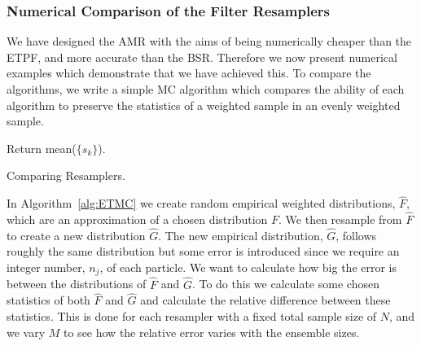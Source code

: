 \documentclass[final]{siamltex}
\begin{document}

\subsubsection{Numerical Comparison of the Filter Resamplers}

We have designed the AMR with the aims of being numerically cheaper than the ETPF, and more accurate
than the BSR. Therefore we now present numerical examples which demonstrate that we have achieved
this. To compare the algorithms, we write a simple MC algorithm which compares the ability of each
algorithm to preserve the statistics of a weighted sample in an evenly weighted sample.

\begin{table}[htpb]
\begin{algorithm}[H]
\DontPrintSemicolon
\BlankLine
{}
Return mean($\{s_k\}$).\;
\caption{Comparing Resamplers.\label{alg:ETMC}}
\end{algorithm}
\end{table}

In Algorithm~\ref{alg:ETMC} we create random empirical weighted distributions, $\hat{F}$, which are an
approximation of a chosen distribution $F$. We then resample from $\hat{F}$ to create a new
distribution $\hat{G}$. The new empirical distribution, $\hat{G}$, follows roughly the same
distribution but some error is introduced since we require an integer number,
$n_j$, of each particle. We want to calculate how big the error is between the distributions of $\hat{F}$ and
$\hat{G}$. To do this we calculate some chosen statistics of both $\hat{F}$ and $\hat{G}$ and
calculate the relative difference between these statistics. This is done for each resampler with a fixed total sample size of $N$,
and we vary $M$ to see how the relative error varies with the ensemble sizes.
\end{document}
